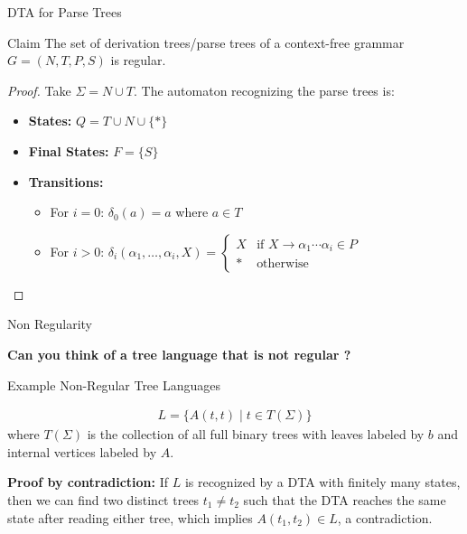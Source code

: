 \documentclass[10pt,svgnames,fragile]{beamer}
\begin{document}
\begin{frame}{DTA for Parse Trees}
    \begin{block}{Claim}
        The set of derivation trees/parse trees of a context-free grammar \( G = (N, T, P, S) \) is regular.
    \end{block}
    \pause
    \begin{proof}
        Take \( \Sigma = N \cup T \). The automaton recognizing the parse trees is:
        
        \begin{itemize}
            \item \textbf{States: } \( Q = T \cup N \cup \{*\} \)
            \item \textbf{Final States: } \( F = \{S\} \)
            \item \textbf{Transitions: } 
                \begin{itemize}
                    \item For \( i = 0 \): \( \delta_0(a) = a \) where \( a \in T \)
                    \item For \( i > 0 \): 
                    \( \delta_i(\alpha_1, \ldots, \alpha_i, X) = \begin{cases}
                        X & \text{if } X \to \alpha_1 \cdots \alpha_i \in P \\
                        * & \text{otherwise}
                    \end{cases} \)
                \end{itemize}
        \end{itemize}
    \end{proof}
\end{frame}

\begin{frame}{Non Regularity}

\textbf{Can you think of a tree language that is not regular ?}

\pause 

\begin{block}{Example Non-Regular Tree Languages}
    
    \begin{align*}
      L = \{A(t, t) \mid t \in T(\Sigma)\}
    \end{align*}
    where $T(\Sigma)$ is the collection of all full binary trees with leaves labeled by $b$ and internal vertices labeled by $A$. \vspace{6pt}
    
    \textbf{Proof by contradiction: } If $L$ is recognized by a DTA with finitely many states, then we can find two distinct trees $t_1 \neq t_2$ such that the DTA reaches the same state after reading either tree, which implies $A(t_1, t_2) \in L$, a contradiction.
  \end{block}
    
\end{frame}
\end{document}
